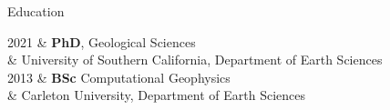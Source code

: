 \begin{rSection}{Education}
	\begin{timeline}
		2021 & \textbf{PhD}, Geological Sciences \\
			& University of Southern California, Department of Earth Sciences \smallskip \\
		2013 & \textbf{BSc} Computational Geophysics \\
			& Carleton University, Department of Earth Sciences
	\end{timeline}
\end{rSection}